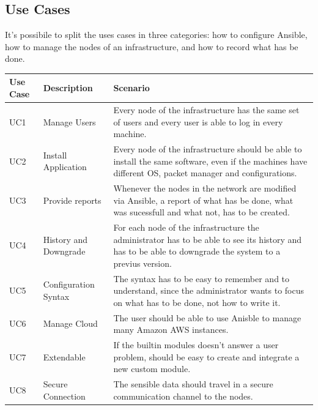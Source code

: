\documentclass[conference]{IEEEtran}
\begin{document}
\subsection{Use Cases}
It's possibile to split the uses cases in three categories: how to configure Ansible, how to manage the nodes of an infrastructure, and how to record what has be done.\\
\begin{table}[htbp]
\begin{center}
\begin{tabular}{|p{0.6cm}|p{1.4cm}|p{5cm}|}
\hline
\textbf{Use Case} &\textbf{Description}&  \textbf{Scenario} \\
\hline
\hline
UC1 & Manage Users & Every node of the infrastructure has the same set of users and every user is able to log in every machine. \\
\hline
UC2 & Install Application & Every node of the infrastructure should be able to install the same software, even if the machines have different OS, packet manager and configurations. \\
\hline
UC3 & Provide reports & Whenever the nodes in the network are modified via Ansible, a report of what has be done, what was sucessfull and what not, has to be created.   \\
\hline
UC4 & History and Downgrade & For each node of the infrastructure the administrator has to be able to see its history and has to be able to downgrade the system to a previus version.\\
\hline
UC5 & Configuration Syntax & The syntax has to be easy to remember and to understand, since the administrator wants to focus on what has to be done, not how to write it.  \\
\hline
UC6 & Manage Cloud & The user should be able to use Anisble to manage many Amazon AWS instances.  \\
\hline
UC7 & Extendable & If the builtin modules doesn't answer a user problem, should be easy to create and integrate a new custom module. \\
\hline
UC8 & Secure Connection & The sensible data should travel in a secure communication channel to the nodes. \\
\hline
\end{tabular}
\label{tab1}
\end{center}
\end{table} 
\newpage
\end{document}
